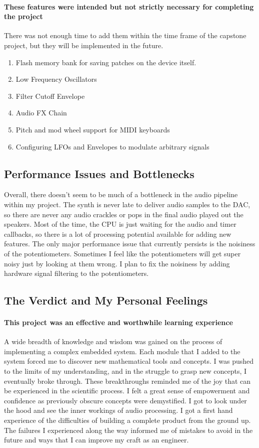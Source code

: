 \documentclass[acmlarge,screen]{acmart}
\begin{document}
	\paragraph{These features were intended but not strictly necessary for completing the project} There was not enough time to add them within the time frame of the capstone project, but they will be implemented in the future.
	\begin{enumerate}
		\item Flash memory bank for saving patches on the device itself.
		\item Low Frequency Oscillators
		\item Filter Cutoff Envelope
		\item Audio FX Chain
		\item Pitch and mod wheel support for MIDI keyboards
		\item Configuring LFOs and Envelopes to modulate arbitrary signals
	\end{enumerate}
		
	\subsection{Performance Issues and Bottlenecks}
	Overall, there doesn't seem to be much of a bottleneck in the audio pipeline within my project. The synth is never late to deliver audio samples to the DAC, so there are never any audio crackles or pops in the final audio played out the speakers. Most of the time, the CPU is just waiting for the audio and timer callbacks, so there is a lot of processing potential available for adding new features. The only major performance issue that currently persists is the noisiness of the potentiometers. Sometimes I feel like the potentiometers will get super noisy just by looking at them wrong. I plan to fix the noisiness by adding hardware signal filtering to the potentiometers.
	
	\subsection{The Verdict and My Personal Feelings}
	\paragraph{This project was an effective and worthwhile learning experience} A wide breadth of knowledge and wisdom was gained on the process of implementing a complex embedded system. Each module that I added to the system forced me to discover new mathematical tools and concepts. I was pushed to the limits of my understanding, and in the struggle to grasp new concepts, I eventually broke through. These breakthroughs reminded me of the joy that can be experienced in the scientific process. I felt a great sense of empowerment and confidence as previously obscure concepts were demystified. I got to look under the hood and see the inner workings of audio processing. I got a first hand experience of the difficulties of building a complete product from the ground up. The failures I experienced along the way informed me of mistakes to avoid in the future and ways that I can improve my craft as an engineer.
\end{document}
